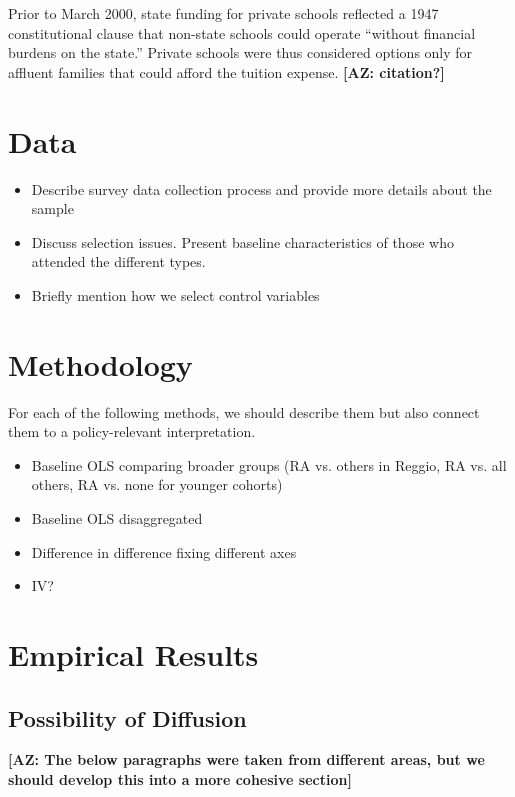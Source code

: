 Prior to March 2000, state funding for private schools reflected a 1947 constitutional clause that non-state schools could operate ``without financial burdens on the state.'' Private schools were thus considered options only for affluent families that could afford the tuition expense. \textbf{[AZ: citation?]}

\section{Data}
\label{sec:data}

\begin{itemize}
\item Describe survey data collection process and provide more details about the sample
\item Discuss selection issues. Present baseline characteristics of those who attended the different types.
\item Briefly mention how we select control variables
\end{itemize}

\section{Methodology}
\label{sec:methodology}
For each of the following methods, we should describe them but also connect them to a policy-relevant interpretation.

\begin{itemize}
\item Baseline OLS comparing broader groups (RA vs. others in Reggio, RA vs. all others, RA vs. none for younger cohorts)
\item Baseline OLS disaggregated
\item Difference in difference fixing different axes
\item IV? 
\end{itemize}

\section{Empirical Results}
\label{sec:results}

\subsection{Possibility of Diffusion}
\label{sec:diffusion}

\textbf{[AZ: The below paragraphs were taken from different areas, but we should develop this into a more cohesive section]}

